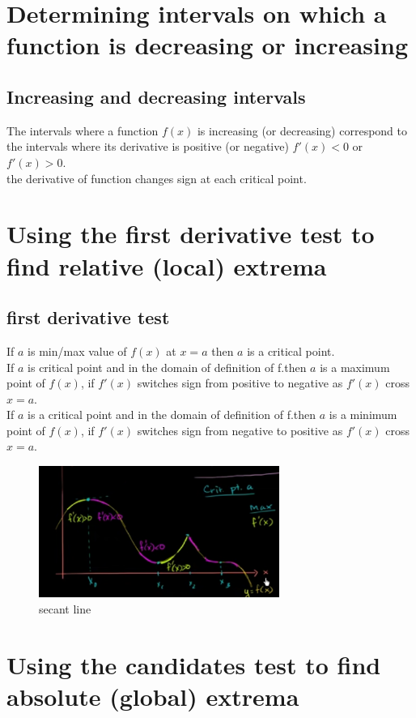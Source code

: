 \documentclass{article}
\begin{document}
\section{Determining intervals on which a function is decreasing or increasing}
    \subsection{Increasing and decreasing intervals}
        The intervals where a function \(f(x)\) is increasing (or decreasing) correspond to the intervals where its derivative is positive (or negative) \(f'(x) < 0\) or \(f'(x) > 0\). \\ 
        the derivative of function changes sign at each critical point. 
\section{Using the first derivative test to find  relative (local) extrema}
    \subsection{first derivative test}
        If \(a\) is  min/max value of \(f(x)\) at \(x = a\) then \(a\) is a critical point.\\
        If \(a\) is critical point and in the domain of definition of f.then \(a\) is a maximum point of \(f(x)\), if \(f'(x)\) switches sign from positive to negative as \(f'(x)\) cross \(x = a\).\\  
        If \(a\) is a critical point and in the domain of definition of f.then \(a\) is a minimum point of \(f(x)\), if \(f'(x)\) switches sign from negative to positive as \(f'(x)\) cross \(x = a\). 
        \begin{figure}[ht]
            \centering
            \includegraphics[bb=0 0 456 249, width=0.7\textwidth]{images/first_derivative_test.png}
            \caption{secant line}\label{fig:first derivative test}
        \end{figure}
\section{Using the candidates test to find absolute (global) extrema}
\end{document}
